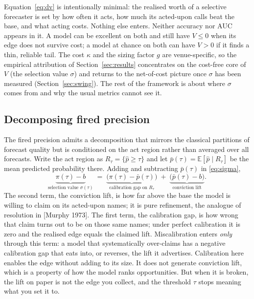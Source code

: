 \documentclass[10pt, a4paper, oneside]{article}
\theoremstyle{definition}
\theoremstyle{plain}
\newcommand{\Pup}{\hat p}
\begin{document}
Equation~\eqref{eq:dv} is intentionally minimal: the realised worth of a selective
forecaster is set by how often it acts, how much its acted-upon calls beat the base,
and what acting costs. Nothing else enters. Neither accuracy nor AUC appears in it.
A model can be excellent on both and still have $V\le 0$ when its edge does not
survive cost; a model at chance on both can have $V>0$ if it finds a thin, reliable
tail. The cost $\kappa$ and the sizing factor $g$ are venue-specific, so the
empirical attribution of Section~\ref{sec:results} concentrates on the cost-free core
of $V$ (the selection value $\sigma$) and returns to the net-of-cost picture once
$\sigma$ has been measured (Section~\ref{sec:swing}). The rest of the framework is
about where $\sigma$ comes from and why the usual metrics cannot see it.

\subsection{Decomposing fired precision}
\label{sec:decomp}
The fired precision admits a decomposition that mirrors the classical partitions of
forecast quality but is conditioned on the act region rather than averaged over all
forecasts. Write the act region as $R_\tau=\{\Pup\ge\tau\}$ and let
$\bar p(\tau)=\mathbb E[\Pup\mid R_\tau]$ be the mean predicted probability there.
Adding and subtracting $\bar p(\tau)$ in \eqref{eq:sigma},
\begin{equation}
\label{eq:partition}
\underbrace{\pi(\tau)-b}_{\text{selection value }\sigma(\tau)}
\;=\;
\underbrace{\big(\pi(\tau)-\bar p(\tau)\big)}_{\text{calibration gap on }R_\tau}
\;+\;
\underbrace{\big(\bar p(\tau)-b\big)}_{\text{conviction lift}} .
\end{equation}
The second term, the conviction lift, is how far above the base the model is willing
to claim on its acted-upon names; it is pure refinement, the analogue of resolution
in [Murphy 1973]. The first term, the calibration gap, is how wrong that claim turns
out to be on those same names; under perfect calibration it is zero and the realised
edge equals the claimed lift. Miscalibration enters \emph{only} through this term: a
model that systematically over-claims has a negative calibration gap that eats into,
or reverses, the lift it advertises. Calibration here enables the edge without adding
to its size. It does not generate conviction lift, which is a property of how the
model ranks opportunities. But when it is broken, the lift on paper is not the edge
you collect, and the threshold $\tau$ stops meaning what you set it to.
\end{document}
